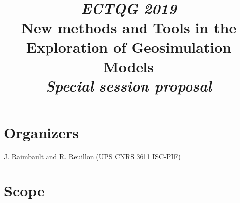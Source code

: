 \documentclass[11pt]{article}
\begin{document}
% 



\title{
\textit{ECTQG 2019}\medskip\\
New methods and Tools in the Exploration of Geosimulation Models\medskip\\
\textit{Special session proposal}
}

\date{}

\maketitle

\justify





\section*{Organizers}

J. Raimbault and R. Reuillon (UPS CNRS 3611 ISC-PIF)


\section*{Scope}
\end{document}
